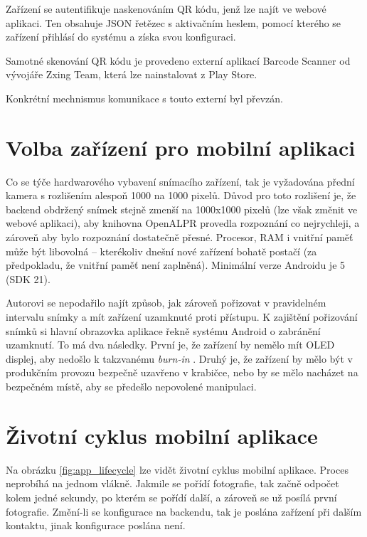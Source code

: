 Zařízení se autentifikuje naskenováním QR kódu, jenž lze najít ve webové aplikaci. Ten obsahuje
JSON řetězec s aktivačním heslem, pomocí kterého se zařízení přihlásí do systému a získa svou konfiguraci.

Samotné skenování QR kódu je provedeno externí aplikací Barcode Scanner od vývojáře
Zxing Team, která lze nainstalovat z Play Store.

Konkrétní mechnismus komunikace s touto externí byl převzán. \citep[viz][]{QrScan}

\section{Volba zařízení pro mobilní aplikaci}

Co se týče hardwarového vybavení snímacího zařízení, tak je vyžadována přední kamera
s rozlišením alespoň 1000 na 1000 pixelů. Důvod pro toto rozlišení je, že backend obdržený snímek
stejně zmenší na 1000x1000 pixelů (lze však změnit ve webové aplikaci), aby knihovna OpenALPR provedla rozpoznání co nejrychleji, a zároveň
aby bylo rozpoznání dostatečně přesné. Procesor, RAM i vnitřní paměť může být libovolná -- kterékoliv
dnešní nové zařízení bohatě postačí (za předpokladu, že vnitřní paměť není zaplněná).
Minimální verze Androidu je 5 (SDK 21).

Autorovi se nepodařilo najít způsob, jak zároveň pořizovat v pravidelném intervalu snímky
a mít zařízení uzamknuté proti přístupu. K zajištění pořizování snímků si hlavní
obrazovka aplikace řekně systému Android o zabránění uzamknutí.
To má dva následky. První je, že zařízení by nemělo mít OLED displej, aby nedošlo k takzvanému
\textit{burn-in} \citep[viz][]{OledBurnIn}. Druhý je, že zařízení by mělo být v produkčním provozu
bezpečně uzavřeno v krabičce, nebo by se mělo nacházet na bezpečném místě, aby se předešlo
nepovolené manipulaci.

\section{Životní cyklus mobilní aplikace}

Na obrázku \ref{fig:app_lifecycle} lze vidět životní cyklus mobilní aplikace.
Proces neprobíhá na jednom vlákně. Jakmile se pořídí fotografie, tak začně odpočet kolem jedné
sekundy, po kterém se pořídí další, a zároveň se už posílá první fotografie.
Změní-li se konfigurace na backendu, tak je poslána zařízení při dalším kontaktu, jinak
konfigurace poslána není.

